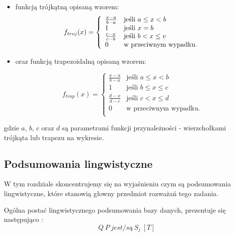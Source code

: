 \documentclass{classrep}
\begin{document}
\begin{itemize}[label=$\bullet$\scshape\bfseries]
\item funkcją trójkątną opisaną wzorem:
\begin{equation}
{f}_{troj}(x)= \left\{ \begin{array}{ll}
\frac{x-a}{b-a} 	& \textrm{jeśli $a \leq x < b$} \\
1 			& \textrm{jeśli $ x = b $} \\
\frac{c-x}{c-b} 	& \textrm{jeśli $b < x \leq v$} \\
0 			& \textrm{w przeciwnym wypadku.} \\
\end{array} \right.
\end{equation}


\item oraz funkcją trapezoidalną opisaną wzorem:

\begin{equation}
{f}_{trap}(x)= \left\{ \begin{array}{ll}
\frac{x-a}{b-a} 	& \textrm{jeśli $a \leq x < b$} \\
1 			& \textrm{jeśli $b \leq x \leq c$} \\
\frac{d-x}{d-c} 	& \textrm{jeśli $c < x \leq d$} \\
0 			& \textrm{w przeciwnym wypadku.} \\
\end{array} \right.
\end{equation}


\end{itemize}

gdzie $a$, $b$, $c$ oraz $d$ są parametrami funkcji przynależności - wierzchołkami trójkąta lub trapezu na wykresie.


\subsection{Podsumowania lingwistyczne}

W tym rozdziale skoncentrujemy się na wyjaśnieniu czym są podsumowania lingwistyczne, które stanowią głowny przedmiot rozważań tego zadania. \newline

Ogólna postać lingwistycznego podsumowania bazy danych, prezentuje się następująco \cite{ksiazka}:
\begin{equation}
Q  ~ P  ~ { \textit{jest/są} }  ~ S_j ~[T]
\end{equation}
\end{document}
